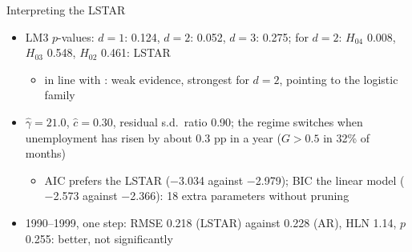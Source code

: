 \begin{frame}{Interpreting the LSTAR}
\itemsize{\footnotesize}
\begin{itemize}
    \item LM3 $p$-values: $d = 1$: 0.124, $d = 2$: 0.052, $d = 3$: 0.275; for $d = 2$: $H_{04}$ 0.008, $H_{03}$ 0.548, $H_{02}$ 0.461: LSTAR
    \begin{itemize}
        \item in line with : weak evidence, strongest for $d = 2$, pointing to the logistic family
    \end{itemize}
    \item $\hat\gamma = 21.0$, $\hat c = 0.30$, residual s.d.\ ratio 0.90; the regime switches when unemployment has risen by about 0.3 pp in a year ($G > 0.5$ in 32\% of months)
    \begin{itemize}
        \item AIC prefers the LSTAR (\ensuremath{-}3.034 against \ensuremath{-}2.979); BIC the linear model (\ensuremath{-}2.573 against \ensuremath{-}2.366): 18 extra parameters without pruning
    \end{itemize}
    \item 1990--1999, one step: RMSE 0.218 (LSTAR) against 0.228 (AR), HLN 1.14, $p$ 0.255: better, not significantly
\end{itemize}
\end{frame}

